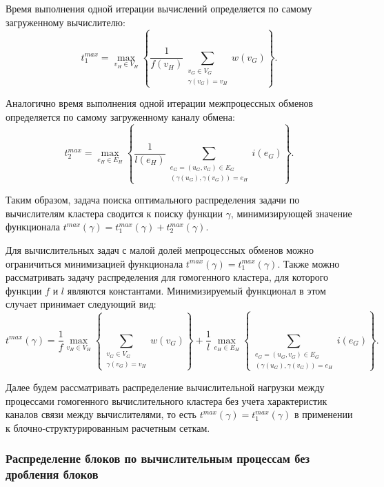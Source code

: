 Время выполнения одной итерации вычислений определяется по самому загруженному вычислителю:
\begin{equation}
	t_1^{max} = \max_{v_H \in V_H}{ \left\{ \frac{1}{f(v_H)} \sum_{\substack{v_G \in V_G \\ \gamma(v_G) = v_H}}{w(v_G)} \right\} }.
\end{equation}

Аналогично время выполнения одной итерации межпроцессных обменов определяется по самому загруженному каналу обмена:
\begin{equation}
	t_2^{max} = \max_{e_H \in E_H}{ \left\{ \frac{1}{l(e_H)} \sum_{\substack{e_G = (u_G, v_G) \in E_G \\ (\gamma(u_G), \gamma(v_G)) = e_H}}{i(e_G)} \right\} }.
\end{equation}

Таким образом, задача поиска оптимального распределения задачи по вычислителям кластера сводится к поиску функции $\gamma$, минимизирующей значение функционала $t^{max}(\gamma) = t_1^{max}(\gamma) + t_2^{max}(\gamma)$.

Для вычислительных задач с малой долей мепроцессных обменов можно ограничиться минимизацией функционала $t^{max}(\gamma) = t_1^{max}(\gamma)$.
Также можно рассматривать задачу распределения для гомогенного кластера, для которого функции $f$ и $l$ являются константами.
Минимизируемый функционал в этом случает принимает следующий вид:
\begin{equation}
	t^{max}(\gamma) =
		\frac{1}{f} \max_{v_H \in V_H}{ \left\{ \sum_{\substack{v_G \in V_G \\ \gamma(v_G) = v_H}}{w(v_G)} \right\} } + 
		\frac{1}{l} \max_{e_H \in E_H}{ \left\{ \sum_{\substack{e_G = (u_G, v_G) \in E_G \\ (\gamma(u_G), \gamma(v_G)) = e_H}}{i(e_G)} \right\} }.
\end{equation}

Далее будем рассматривать распределение вычислительной нагрузки между процессами гомогенного вычислительного кластера без учета характеристик каналов связи между вычислителями, то есть $t^{max}(\gamma) = t_1^{max}(\gamma)$ в применении к блочно-структурированным расчетным сеткам.

\newpage
\subsubsection{Распределение блоков по вычислительным процессам без дробления блоков}

